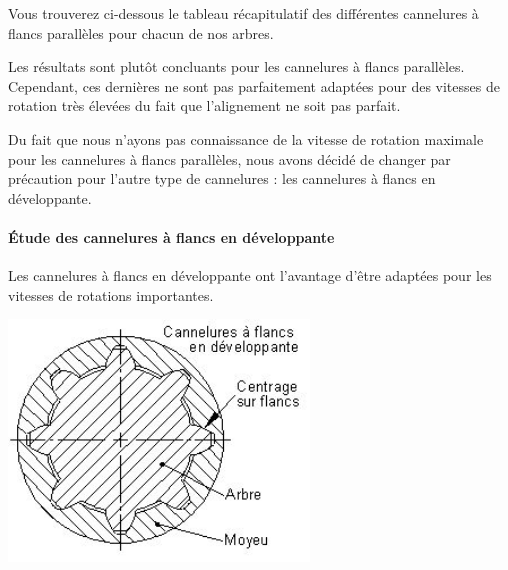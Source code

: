 \documentclass{config}
\begin{document}
\begin{spacing}{1.2}
    
Vous trouverez ci-dessous le tableau récapitulatif des différentes cannelures à flancs parallèles pour chacun de nos arbres.

\begin{table}[h]
\centering
{}
\end{table}

Les résultats sont plutôt concluants pour les cannelures à flancs parallèles. Cependant, ces dernières ne sont pas parfaitement adaptées pour des vitesses de rotation très élevées du fait que l'alignement ne soit pas parfait. 

Du fait que nous n'ayons pas connaissance de la vitesse de rotation maximale pour les cannelures à flancs parallèles, nous avons décidé de changer par précaution pour l'autre type de cannelures : les cannelures à flancs en développante.
\newpage

\paragraph{Étude des cannelures à flancs en développante \\}

Les cannelures à flancs en développante ont l'avantage d'être adaptées pour les vitesses de rotations importantes.

\begin{center}
\includegraphics[width=0.6\textwidth]{cannelure_developpante.jpg}
\end{center}


\end{spacing}
\end{document}
